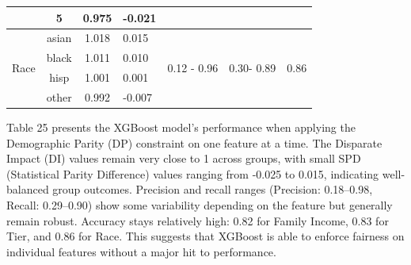\documentclass{article}
\begin{document}
\begin{table}[H]
\begin{tabular}{lccc|ccc}
                               & 5     & 0.975                  & -0.021                     &                                                  &                                                 &                                           \\
\hline
\multirow{4}{*}{Race}          & asian & 1.018                  & \multicolumn{1}{l|}{0.015}  & \multicolumn{1}{c}{\multirow{4}{*}{0.12 - 0.96}} & \multicolumn{1}{c}{\multirow{4}{*}{0.30- 0.89}} & \multicolumn{1}{c}{\multirow{4}{*}{0.86}} \\
                               & black & 1.011                  & \multicolumn{1}{l|}{0.010}  & \multicolumn{1}{l}{}                             & \multicolumn{1}{l}{}                            & \multicolumn{1}{l}{}                      \\
                               & hisp  & 1.001                  & \multicolumn{1}{l|}{0.001}  & \multicolumn{1}{l}{}                             & \multicolumn{1}{l}{}                            & \multicolumn{1}{l}{}                      \\
                               & other & 0.992                  & \multicolumn{1}{l|}{-0.007} & \multicolumn{1}{l}{}                             & \multicolumn{1}{l}{}                            & \multicolumn{1}{l}{}                     
\end{tabular}
\end{table}
Table 25 presents the XGBoost model’s performance when applying the Demographic Parity (DP) constraint on one feature at a time. The Disparate Impact (DI) values remain very close to 1 across groups, with small SPD (Statistical Parity Difference) values ranging from -0.025 to 0.015, indicating well-balanced group outcomes. Precision and recall ranges (Precision: 0.18–0.98, Recall: 0.29–0.90) show some variability depending on the feature but generally remain robust. Accuracy stays relatively high: 0.82 for Family Income, 0.83 for Tier, and 0.86 for Race. This suggests that XGBoost is able to enforce fairness on individual features without a major hit to performance.
\end{document}
